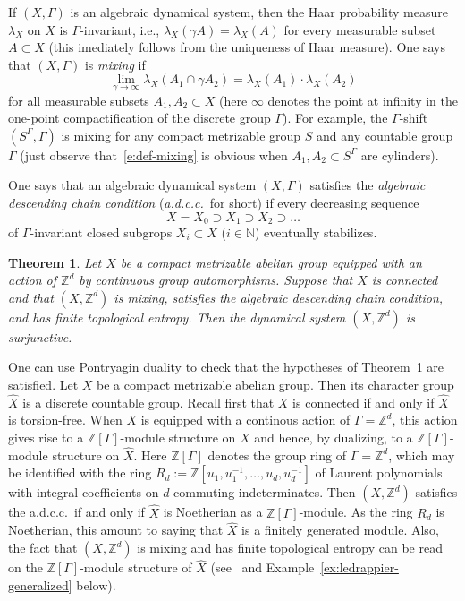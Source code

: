 \documentclass[12pt,a4paper]{amsart}
\newtheorem{theorem}{Theorem}[section]
\theoremstyle{definition}
\numberwithin{equation}{section}
\begin{document}
If  $(X,\Gamma)$ is an algebraic dynamical system, then the  Haar probability measure $\lambda_X$ on $X$ is $\Gamma$-invariant, i.e., $\lambda_X(\gamma A) = \lambda_X(A)$ for every measurable subset 
$A \subset X$ (this imediately follows from the uniqueness of Haar measure).
One says that $(X,\Gamma)$ is \emph{mixing} if
\begin{equation}
\label{e:def-mixing}
\lim\limits_{\gamma \to\infty}
\lambda_{X}(A_{1} \cap \gamma A_{2})
=\lambda_{X}(A_{1})\cdot\lambda_{X}(A_{2})
\end{equation}
for all measurable subsets $A_1,A_2 \subset X$ (here $\infty$ denotes the point at infinity in the 
one-point compactification of the discrete group $\Gamma$).
For example, the $\Gamma$-shift $(S^\Gamma,\Gamma)$ is mixing for any 
compact metrizable group $S$ and any countable group $\Gamma$  (just observe 
that~\eqref{e:def-mixing}  is obvious when 
$A_1, A_2 \subset S^\Gamma$ are cylinders).
\par
    One says that an algebraic  dynamical system $(X,\Gamma)$ satisfies the \emph{algebraic descending chain condition} (\emph{a.d.c.c.}\ for short)  if every decreasing sequence
$$
X = X_0 \supset X_1 \supset X_2 \supset \dots
$$
of $\Gamma$-invariant closed subgrops $X_i \subset X$ ($i \in {\mathbb{N}}$) eventually stabilizes.

\begin{theorem}
\label{t:th3}
Let $X$ be a compact metrizable abelian group equipped with an action of  ${\mathbb{Z}}^d$ by continuous group automorphisms.
Suppose that $X$ is connected and that  $(X,{\mathbb{Z}}^d)$ is mixing, satisfies the algebraic descending chain condition, and has finite topological entropy.
Then the dynamical system $(X,{\mathbb{Z}}^d)$ is surjunctive.
\end{theorem}

One can use Pontryagin duality to check that the hypotheses of Theorem~\ref{t:th3} are satisfied. 
Let  $X$ be a compact metrizable abelian group. Then its character group
$\widehat{X}$ is a discrete countable group.
Recall first that $X$ is connected if and only if $\widehat{X}$ is torsion-free.
When $X$ is equipped with a continous action of $\Gamma = {\mathbb{Z}}^d$, this action gives rise to a 
${\mathbb{Z}}[\Gamma]$-module structure on $X$ and hence, by dualizing, to a ${\mathbb{Z}}[\Gamma]$-module structure on $\widehat{X}$. Here ${\mathbb{Z}}[\Gamma]$ denotes the group ring of $\Gamma = {\mathbb{Z}}^d$, which may be identified with the ring
$R_d := {\mathbb{Z}}[u_1,u_1^{-1},\dots,u_d,u_d^{-1}]$
 of Laurent polynomials with integral coefficients on $d$ commuting indeterminates.
 Then $(X,{\mathbb{Z}}^d)$ satisfies the a.d.c.c.\ if and only if $\widehat{X}$ is Noetherian as a ${\mathbb{Z}}[\Gamma]$-module. As the ring $R_d$ is Noetherian, this amount to saying that $\widehat{X}$ is a finitely generated module. Also, the fact that $(X,{\mathbb{Z}}^d)$ is mixing and has finite topological entropy can be read on   the ${\mathbb{Z}}[\Gamma]$-module structure of $\widehat{X}$
 (see~\cite{schmidt-book} and Example~\ref{ex:ledrappier-generalized} below).  
\end{document}
